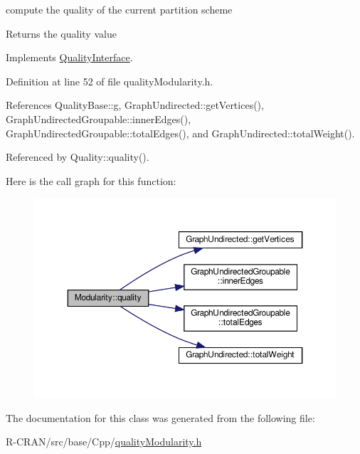 compute the quality of the current partition scheme \begin{DoxyReturn}{Returns}
the quality value 
\end{DoxyReturn}


Implements \hyperlink{classQualityInterface_a1c40b3e5e51d8ed2a4390b3cb0164f0a}{Quality\+Interface}.



Definition at line 52 of file quality\+Modularity.\+h.



References Quality\+Base\+::g, Graph\+Undirected\+::get\+Vertices(), Graph\+Undirected\+Groupable\+::inner\+Edges(), Graph\+Undirected\+Groupable\+::total\+Edges(), and Graph\+Undirected\+::total\+Weight().



Referenced by Quality\+::quality().

Here is the call graph for this function\+:
\nopagebreak
\begin{figure}[H]
\begin{center}
\leavevmode
\includegraphics[width=350pt]{classModularity_ab594c2c6ccde0e9467d7548923612c3a_cgraph}
\end{center}
\end{figure}


The documentation for this class was generated from the following file\+:\begin{DoxyCompactItemize}
\item 
R-\/\+C\+R\+A\+N/src/base/\+Cpp/\hyperlink{qualityModularity_8h}{quality\+Modularity.\+h}\end{DoxyCompactItemize}
